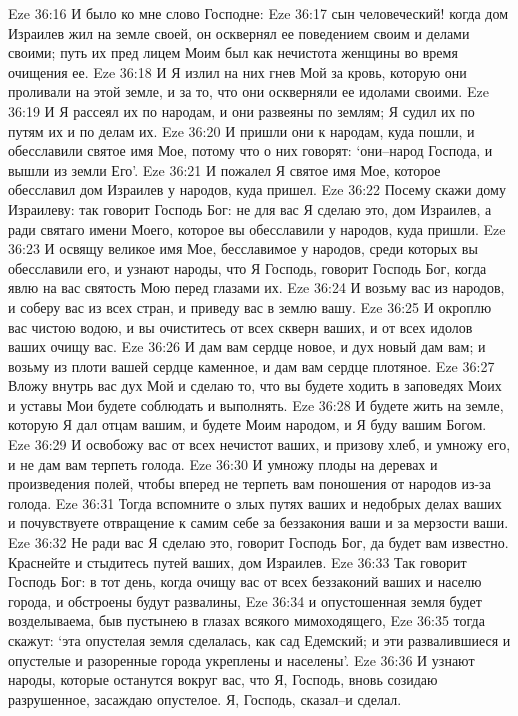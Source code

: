 Eze 36:16  И было ко мне слово Господне:
Eze 36:17  сын человеческий! когда дом Израилев жил на земле своей, он осквернял ее поведением своим и делами своими; путь их пред лицем Моим был как нечистота женщины во время очищения ее.
Eze 36:18  И Я излил на них гнев Мой за кровь, которую они проливали на этой земле, и за то, что они оскверняли ее идолами своими.
Eze 36:19  И Я рассеял их по народам, и они развеяны по землям; Я судил их по путям их и по делам их.
Eze 36:20  И пришли они к народам, куда пошли, и обесславили святое имя Мое, потому что о них говорят: `они--народ Господа, и вышли из земли Его'.
Eze 36:21  И пожалел Я святое имя Мое, которое обесславил дом Израилев у народов, куда пришел.
Eze 36:22  Посему скажи дому Израилеву: так говорит Господь Бог: не для вас Я сделаю это, дом Израилев, а ради святаго имени Моего, которое вы обесславили у народов, куда пришли.
Eze 36:23  И освящу великое имя Мое, бесславимое у народов, среди которых вы обесславили его, и узнают народы, что Я Господь, говорит Господь Бог, когда явлю на вас святость Мою перед глазами их.
Eze 36:24  И возьму вас из народов, и соберу вас из всех стран, и приведу вас в землю вашу.
Eze 36:25  И окроплю вас чистою водою, и вы очиститесь от всех скверн ваших, и от всех идолов ваших очищу вас.
Eze 36:26  И дам вам сердце новое, и дух новый дам вам; и возьму из плоти вашей сердце каменное, и дам вам сердце плотяное.
Eze 36:27  Вложу внутрь вас дух Мой и сделаю то, что вы будете ходить в заповедях Моих и уставы Мои будете соблюдать и выполнять.
Eze 36:28  И будете жить на земле, которую Я дал отцам вашим, и будете Моим народом, и Я буду вашим Богом.
Eze 36:29  И освобожу вас от всех нечистот ваших, и призову хлеб, и умножу его, и не дам вам терпеть голода.
Eze 36:30  И умножу плоды на деревах и произведения полей, чтобы вперед не терпеть вам поношения от народов из-за голода.
Eze 36:31  Тогда вспомните о злых путях ваших и недобрых делах ваших и почувствуете отвращение к самим себе за беззакония ваши и за мерзости ваши.
Eze 36:32  Не ради вас Я сделаю это, говорит Господь Бог, да будет вам известно. Краснейте и стыдитесь путей ваших, дом Израилев.
Eze 36:33  Так говорит Господь Бог: в тот день, когда очищу вас от всех беззаконий ваших и населю города, и обстроены будут развалины,
Eze 36:34  и опустошенная земля будет возделываема, быв пустынею в глазах всякого мимоходящего,
Eze 36:35  тогда скажут: `эта опустелая земля сделалась, как сад Едемский; и эти развалившиеся и опустелые и разоренные города укреплены и населены'.
Eze 36:36  И узнают народы, которые останутся вокруг вас, что Я, Господь, вновь созидаю разрушенное, засаждаю опустелое. Я, Господь, сказал--и сделал.
